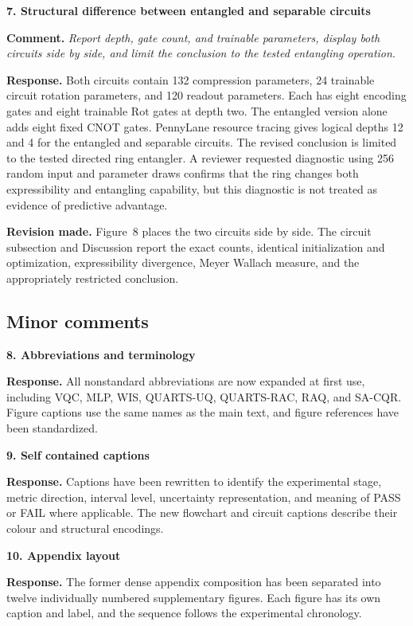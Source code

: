 \documentclass[11pt]{article}
\newcommand{\comment}[1]{\textbf{Comment.} \emph{#1}}
\newcommand{\response}[1]{\textbf{Response.} #1}
\newcommand{\change}[1]{\textbf{Revision made.} #1}
\begin{document}
\textbf{7. Structural difference between entangled and separable circuits}

\comment{Report depth, gate count, and trainable parameters, display both circuits side by side, and limit the conclusion to the tested entangling operation.}

\response{Both circuits contain 132 compression parameters, 24 trainable circuit rotation parameters, and 120 readout parameters. Each has eight encoding gates and eight trainable $\mathrm{Rot}$ gates at depth two. The entangled version alone adds eight fixed CNOT gates. PennyLane resource tracing gives logical depths 12 and 4 for the entangled and separable circuits. The revised conclusion is limited to the tested directed ring entangler. A reviewer requested diagnostic using 256 random input and parameter draws confirms that the ring changes both expressibility and entangling capability, but this diagnostic is not treated as evidence of predictive advantage.}

\change{Figure~8 places the two circuits side by side. The circuit subsection and Discussion report the exact counts, identical initialization and optimization, expressibility divergence, Meyer Wallach measure, and the appropriately restricted conclusion.}

\subsection*{Minor comments}

\textbf{8. Abbreviations and terminology}

\response{All nonstandard abbreviations are now expanded at first use, including VQC, MLP, WIS, QUARTS-UQ, QUARTS-RAC, RAQ, and SA-CQR. Figure captions use the same names as the main text, and figure references have been standardized.}

\textbf{9. Self contained captions}

\response{Captions have been rewritten to identify the experimental stage, metric direction, interval level, uncertainty representation, and meaning of PASS or FAIL where applicable. The new flowchart and circuit captions describe their colour and structural encodings.}

\textbf{10. Appendix layout}

\response{The former dense appendix composition has been separated into twelve individually numbered supplementary figures. Each figure has its own caption and label, and the sequence follows the experimental chronology.}
\end{document}
